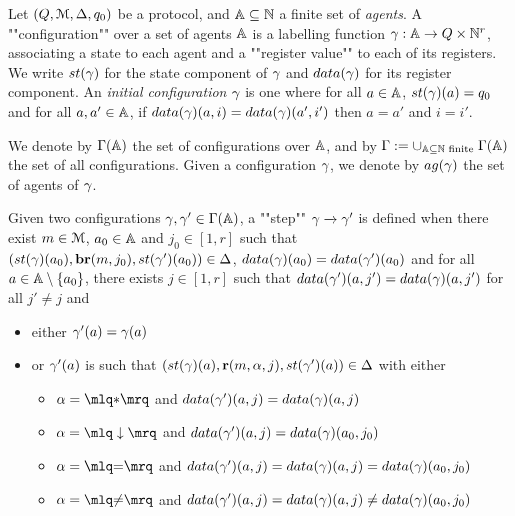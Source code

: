 \begin{definition}[Semantics]
	Let $(Q,\mathcal{M}, \Delta, q_0)$ be a protocol, and $\mathbb{A} \subseteq \mathbb{N}$ a finite set of \emph{agents}.
	A ""configuration"" over a set of agents $\mathbb{A}$ is a labelling function $\gamma : \mathbb{A} \to Q \times \mathbb{N}^r$, associating a state to each agent and a ""register value"" to each of its registers. 
	We write $\st{\config}$ for the state component of $\gamma$ and $\data{\config}$ for its register component.
	An \emph{initial configuration} $\gamma$ is one where for all $a \in \mathbb{A}$, $\st{\config}(a) = q_0$ and for all $a, a' \in \mathbb{A}$, if $\data{\config}(a, i) = \data{\config}(a', i')$ then $a=a'$ and $i=i'$.
	
	\AP We denote by $\Gamma(\mathbb{A})$ the set of configurations over $\mathbb{A}$, and by $\Gamma := \cup_{\mathbb{A} \subseteq \mathbb{N} \text{ finite }} \Gamma(\mathbb{A})$ the set of all configurations. Given a configuration $\gamma$, we denote by $\agentsof{\config}$ the set of agents of $\gamma$.
	
	\AP Given two configurations $\gamma, \gamma' \in \Gamma(\mathbb{A})$, a ""step"" $\gamma \xrightarrow{} \gamma'$ is defined when there exist $m \in \mathcal{M}$, $a_0 \in \mathbb{A}$ and $j_0 \in [1,r]$ such that $(\st{\config}(a_0),\br{\amessage}{j_0}, \st{\config'}(a_0)) \in \transitions$, $\data{\config}(a_0) = \data{\config'}(a_0)$ and for all $a \in \mathbb{A}\setminus \{a_0\}$, there exists $j \in [1,r]$ such that $\data{\config'}(a, j') = \data{\config}(a, j')$ for all $j' \neq j$ and
	\begin{itemize}
		\item either $\gamma'(a) = \gamma(a)$
		
		\item or $\gamma'(a)$ is such that $(\st{\config}(a), \rec{\amessage}{\anact}{j}, \st{\config'}(a)) \in \transitions$ with either
		\begin{itemize}
			\item $\anact = \quotemarks{\dummyact}$ 
			and $\data{\config'}(a,j) = \data{\config}(a,j)$
			\item $\anact = \quotemarks{\enregact}$ and $\data{\config'}(a,j) = \data{\config}(a_0,j_0)$
			\item $\anact = \quotemarks{\eqtestact}$ and $\data{\config'}(a,j) = \data{\config}(a,j) =\data{\config}(a_0,j_0)$
			\item $\anact = \quotemarks{\diseqtestact}$ and $\data{\config'}(a,j) = \data{\config}(a,j) \ne \data{\config}(a_0,j_0)$
		\end{itemize}
	\end{itemize}
	

\end{definition}
